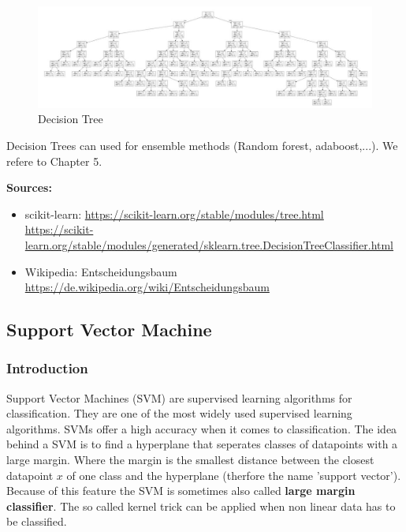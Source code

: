 \begin{figure}[hbtp]
	\centering
	\includegraphics[scale=0.5]{tree}
	\caption{Decision Tree}
	\label{fig:Datensatz - unbearbeitet}
\end{figure}


Decision Trees can used for ensemble methods (Random forest, adaboost,...). We refere to Chapter 5.

\textbf{Sources:}
\begin{itemize}
\item scikit-learn: \hyperlink{https://scikit-learn.org/stable/modules/tree.html}{https://scikit-learn.org/stable/modules/tree.html} \\
\hyperlink{https://scikit-learn.org/stable/modules/generated/sklearn.tree.DecisionTreeClassifier.html}{https://scikit-learn.org/stable/modules/generated/sklearn.tree.DecisionTreeClassifier.html}
\item Wikipedia: Entscheidungsbaum \hyperlink{https://de.wikipedia.org/wiki/Entscheidungsbaum}{https://de.wikipedia.org/wiki/Entscheidungsbaum}
\end{itemize}

\subsection{Support Vector Machine}
\subsubsection{Introduction}

Support Vector Machines (SVM) are supervised learning algorithms for classification.
They are one of the most widely used supervised learning algorithms. 
SVMs offer a high accuracy when it comes to classification.
The idea behind a SVM is to find a hyperplane that seperates classes of datapoints with a large margin. Where the margin is the smallest distance between the closest datapoint $x$ of one class and the hyperplane (therfore the name 'support vector'). Because of this feature the SVM is sometimes also called \textbf{large margin classifier}.
The so called kernel trick can be applied when non linear data has to be classified.


